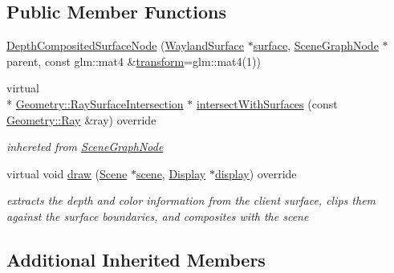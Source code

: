 \subsection*{Public Member Functions}
\begin{DoxyCompactItemize}
\item 
\hyperlink{classmotorcar_1_1DepthCompositedSurfaceNode_a94941759b0671f775dc1100304ef83e6}{Depth\-Composited\-Surface\-Node} (\hyperlink{classmotorcar_1_1WaylandSurface}{Wayland\-Surface} $\ast$\hyperlink{simple-egl_8c_a0720952aa1caded45b5bcdce589663a9}{surface}, \hyperlink{classmotorcar_1_1SceneGraphNode}{Scene\-Graph\-Node} $\ast$parent, const glm\-::mat4 \&\hyperlink{classmotorcar_1_1SceneGraphNode_ad96e79fdd739ac8223a3128003be391a}{transform}=glm\-::mat4(1))
\item 
virtual \\*
\hyperlink{structmotorcar_1_1Geometry_1_1RaySurfaceIntersection}{Geometry\-::\-Ray\-Surface\-Intersection} $\ast$ \hyperlink{classmotorcar_1_1DepthCompositedSurfaceNode_a83366f22b28b7028cf38ae86692d720a}{intersect\-With\-Surfaces} (const \hyperlink{structmotorcar_1_1Geometry_1_1Ray}{Geometry\-::\-Ray} \&ray) override
\begin{DoxyCompactList}\small\item\em inhereted from \hyperlink{classmotorcar_1_1SceneGraphNode}{Scene\-Graph\-Node} \end{DoxyCompactList}\item 
virtual void \hyperlink{classmotorcar_1_1DepthCompositedSurfaceNode_a2108d586ac8641beec9f6d048e3ea562}{draw} (\hyperlink{classmotorcar_1_1Scene}{Scene} $\ast$\hyperlink{classmotorcar_1_1SceneGraphNode_aa14e637ed4ae98f77e28941a4b5cfdd8}{scene}, \hyperlink{classmotorcar_1_1Display}{Display} $\ast$\hyperlink{structdisplay}{display}) override
\begin{DoxyCompactList}\small\item\em extracts the depth and color information from the client surface, clips them against the surface boundaries, and composites with the scene \end{DoxyCompactList}\end{DoxyCompactItemize}
\subsection*{Additional Inherited Members}


